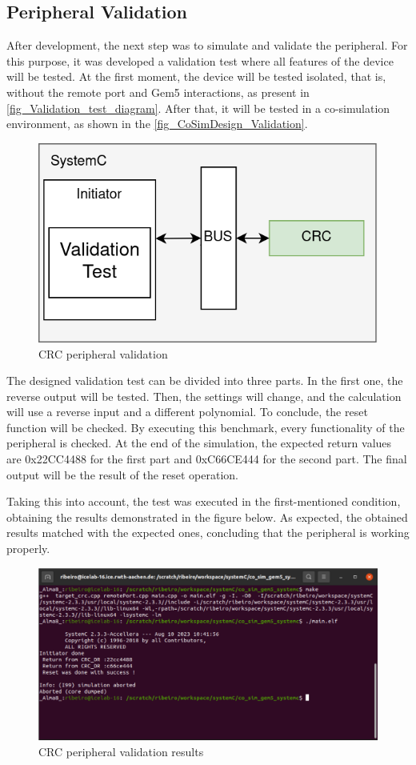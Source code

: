 \subsection{Peripheral Validation}

After development, the next step was to simulate and validate the peripheral. For this purpose, it was developed a validation test where
all features of the device will be tested. At the first moment, the device will be tested isolated, that is, without the remote port and Gem5 
interactions, as present in \autoref{fig_Validation_test_diagram}. After that, it will be tested in a co-simulation environment, as shown in the 
\autoref{fig_CoSimDesign_Validation}. 

\begin{figure}[H]
	\centering
 	\includegraphics[width=0.5\linewidth]{Images/Validation_test_diagram.png} 
 	\caption{CRC peripheral validation}
	\label{fig_Validation_test_diagram}
\end{figure}

The designed validation test can be divided into three parts. In the first one, the reverse output will be tested. Then, the settings will 
change, and the calculation will use a reverse input and a different polynomial. To conclude, the reset function will be checked. 
By executing this benchmark, every functionality of the peripheral is checked. At the end of the simulation, the expected return values are 
0x22CC4488 for the first part and 0xC66CE444 for the second part. The final output will be the result of the reset operation. 

Taking this into account, the test was executed in the first-mentioned condition, obtaining the results demonstrated in the figure below. As 
expected, the obtained results matched with the expected ones, concluding that the peripheral is working properly. 

\begin{figure}[H]
	\centering
 	\includegraphics[width=0.9\linewidth]{Images/Validation_SystemC.png} 
 	\caption{CRC peripheral validation results}
\end{figure}

